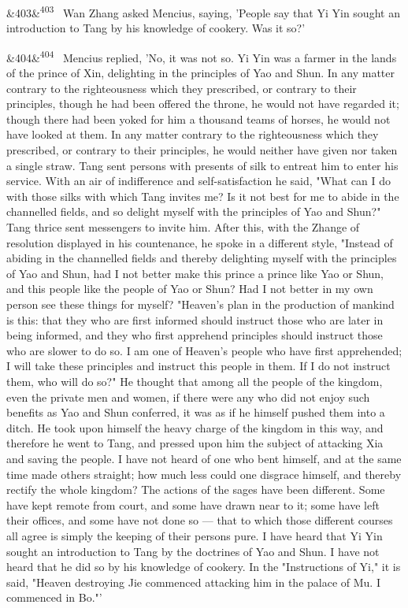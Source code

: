 \documentclass[12pt]{article}
\newcommand{\para}[1][]{\par\noindent\ifx&#1&\else\textsuperscript{\footnotesize #1}~\fi}
\begin{document}
\para[403] Wan Zhang asked Mencius, saying, 'People say that Yi Yin sought an introduction to Tang by his knowledge of cookery. Was it so?'

\para[404] Mencius replied, 'No, it was not so. Yi Yin was a farmer in the lands of the prince of Xin, delighting in the principles of Yao and Shun. In any matter contrary to the righteousness which they prescribed, or contrary to their principles, though he had been offered the throne, he would not have regarded it; though there had been yoked for him a thousand teams of horses, he would not have looked at them. In any matter contrary to the righteousness which they prescribed, or contrary to their principles, he would neither have given nor taken a single straw. Tang sent persons with presents of silk to entreat him to enter his service. With an air of indifference and self-satisfaction he said, "What can I do with those silks with which Tang invites me? Is it not best for me to abide in the channelled fields, and so delight myself with the principles of Yao and Shun?" Tang thrice sent messengers to invite him. After this, with the Zhange of resolution displayed in his countenance, he spoke in a different style, "Instead of abiding in the channelled fields and thereby delighting myself with the principles of Yao and Shun, had I not better make this prince a prince like Yao or Shun, and this people like the people of Yao or Shun? Had I not better in my own person see these things for myself? "Heaven's plan in the production of mankind is this: that they who are first informed should instruct those who are later in being informed, and they who first apprehend principles should instruct those who are slower to do so. I am one of Heaven's people who have first apprehended; I will take these principles and instruct this people in them. If I do not instruct them, who will do so?" He thought that among all the people of the kingdom, even the private men and women, if there were any who did not enjoy such benefits as Yao and Shun conferred, it was as if he himself pushed them into a ditch. He took upon himself the heavy charge of the kingdom in this way, and therefore he went to Tang, and pressed upon him the subject of attacking Xia and saving the people. I have not heard of one who bent himself, and at the same time made others straight; how much less could one disgrace himself, and thereby rectify the whole kingdom? The actions of the sages have been different. Some have kept remote from court, and some have drawn near to it; some have left their offices, and some have not done so --- that to which those different courses all agree is simply the keeping of their persons pure. I have heard that Yi Yin sought an introduction to Tang by the doctrines of Yao and Shun. I have not heard that he did so by his knowledge of cookery. In the "Instructions of Yi," it is said, "Heaven destroying Jie commenced attacking him in the palace of Mu. I commenced in Bo."'
\end{document}
